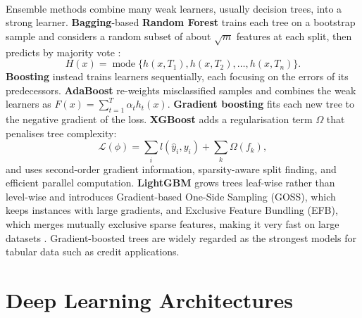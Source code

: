 \documentclass[12pt,a4paper,final]{extreport}
\begin{document}
\paragraph{} Ensemble methods combine many weak learners, usually decision trees, into a strong learner. \textbf{Bagging}-based \textbf{Random Forest} \cite{breiman2001} trains each tree on a bootstrap sample and considers a random subset of about $\sqrt{m}$ features at each split, then predicts by majority vote \cite{p3}:
\begin{equation}
H(x)=\operatorname{mode}\{h(x,T_1),h(x,T_2),\ldots,h(x,T_n)\}.
\end{equation}
\textbf{Boosting} instead trains learners sequentially, each focusing on the errors of its predecessors. \textbf{AdaBoost} re-weights misclassified samples and combines the weak learners as $F(x)=\sum_{t=1}^{T}\alpha_t h_t(x)$. \textbf{Gradient boosting} fits each new tree to the negative gradient of the loss. \textbf{XGBoost} \cite{chen2016} adds a regularisation term $\Omega$ that penalises tree complexity:
\begin{equation}
\mathcal{L}(\phi)=\sum_{i} l(\hat{y}_i,y_i)+\sum_{k}\Omega(f_k),
\end{equation}
and uses second-order gradient information, sparsity-aware split finding, and efficient parallel computation. \textbf{LightGBM} \cite{ke2017} grows trees leaf-wise rather than level-wise and introduces Gradient-based One-Side Sampling (GOSS), which keeps instances with large gradients, and Exclusive Feature Bundling (EFB), which merges mutually exclusive sparse features, making it very fast on large datasets \cite{p3}. Gradient-boosted trees are widely regarded as the strongest models for tabular data such as credit applications.

\section{Deep Learning Architectures}
\end{document}
